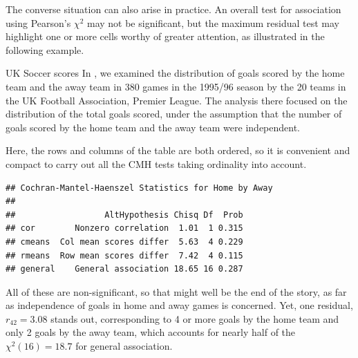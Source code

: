 \documentclass[11pt]{book}
\renewenvironment{knitrout}{\small\renewcommand{\baselinestretch}{.85}}{} %
\begin{document}
The converse situation can also arise in practice. An overall test for association
using Pearson's $\chi^2$ may not be significant, but the maximum residual test
may highlight one or more cells worthy of greater attention, as illustrated in
the following example.


\begin{Example}[soccer2]{UK Soccer scores}
In , we examined the distribution of goals scored
by the home team and the away team in 380 games in the 1995/96 season
by the 20 teams in the UK Football Association, Premier League.
The analysis there focused on the distribution of the total goals
scored, under the assumption that the number of goals scored by
the home team and the away team were independent.

Here, the rows and columns of the table  are both ordered,
so it is convenient and compact to carry out all the CMH tests taking
ordinality into account.
\begin{knitrout}
\color{fgcolor}\begin{kframe}
\begin{alltt}
\hlstd{(}\hlstd{,} \hlstd{=}\hlstd{)}
\end{alltt}
\begin{verbatim}
## Cochran-Mantel-Haenszel Statistics for Home by Away 
## 
##                  AltHypothesis Chisq Df  Prob
## cor        Nonzero correlation  1.01  1 0.315
## cmeans  Col mean scores differ  5.63  4 0.229
## rmeans  Row mean scores differ  7.42  4 0.115
## general    General association 18.65 16 0.287
\end{verbatim}
\end{kframe}
\end{knitrout}
All of these are non-significant, so that might well be the end of the story,
as far as independence of goals in home and away games is concerned. Yet, one
residual, $r_{42} = 3.08$ stands out, corresponding to 4 or more goals by
the home team and only 2 goals by the away team, which accounts for nearly
half of the $\chi^2 (16) = 18.7$ for general association.

\begin{knitrout}
\color{fgcolor}\begin{kframe}
\begin{alltt}
\hlstd{(}\hlstd{)}
   \hlstd{=}\hlstd{)}
\end{alltt}
\end{kframe}\begin{figure}[!htbp]



\end{figure}
\end{knitrout}
\end{Example}
\end{document}
